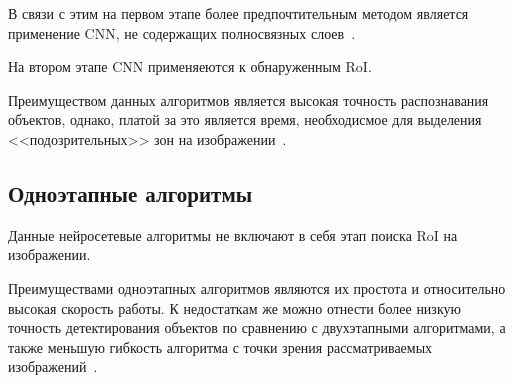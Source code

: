 В связи с этим на первом этапе более предпочтительным методом является применение CNN, не содержащих полносвязных слоев~\cite{realtime-recognition-algorythm}.

На втором этапе CNN применяеются к обнаруженным RoI.

Преимуществом данных алгоритмов является высокая точность распознавания объектов, однако, платой за это является время, необходисмое для выделения <<подозрительных>> зон на изображении~\cite{overview-of-two-stage-object-detection}.

\subsection{Одноэтапные алгоритмы}

Данные нейросетевые алгоритмы не включают в себя этап поиска RoI на изображении.



Преимуществами одноэтапных алгоритмов являются их простота и относительно высокая скорость работы. К недостаткам же можно отнести более низкую точность детектирования объектов по сравнению с двухэтапными алгоритмами, а также меньшую гибкость алгоритма с точки зрения рассматриваемых изображений~\cite{review-on-one-stage-object-detection}.

